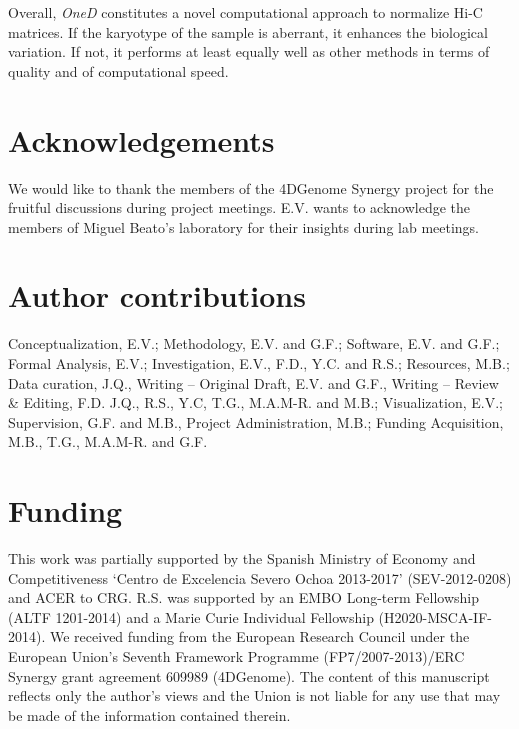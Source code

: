 \documentclass{article}
\begin{document}
Overall, \textit{OneD} constitutes a novel computational approach to
normalize Hi-C matrices. If the karyotype of the sample is aberrant, it
enhances the biological variation.  If not, it performs at least equally
well as other methods in terms of quality and of computational speed.


\section*{Acknowledgements}

We would like to thank the members of the 4DGenome Synergy project for the
fruitful discussions during project meetings. E.V. wants to acknowledge
the members of Miguel Beato's laboratory for their insights during lab
meetings.

\section*{Author contributions}

Conceptualization, E.V.; Methodology, E.V. and G.F.; Software, E.V. and
G.F.; Formal Analysis, E.V.; Investigation, E.V., F.D., Y.C. and R.S.;
Resources, M.B.; Data curation, J.Q., Writing – Original Draft, E.V. and
G.F., Writing – Review \& Editing, F.D. J.Q., R.S., Y.C, T.G., M.A.M-R.
and M.B.; Visualization, E.V.; Supervision, G.F. and M.B., Project
Administration, M.B.; Funding Acquisition, M.B., T.G., M.A.M-R. and G.F.

\section*{Funding}

This work was partially supported by the Spanish Ministry of Economy and
Competitiveness `Centro de Excelencia Severo Ochoa 2013-2017'
(SEV-2012-0208) and ACER to CRG. R.S. was supported by an EMBO Long-term
Fellowship (ALTF 1201-2014) and a Marie Curie Individual Fellowship
(H2020-MSCA-IF-2014). We received funding from the European Research
Council under the European Union's Seventh Framework Programme
(FP7/2007-2013)/ERC Synergy grant agreement 609989 (4DGenome). The content
of this manuscript reflects only the author's views and the Union is not
liable for any use that may be made of the information contained therein.

\vspace*{-12pt}



\end{document}
